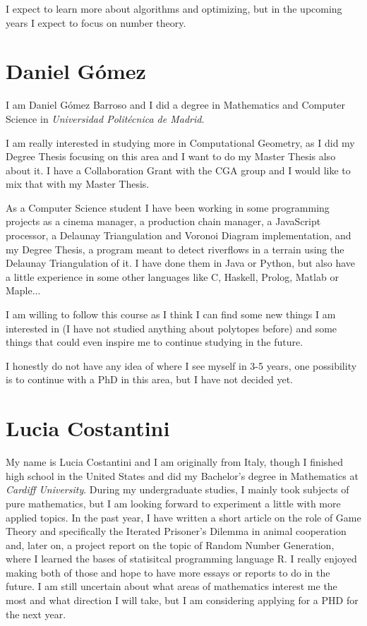 \documentclass[11pt]{amsart}
\begin{document}
I expect to learn more about algorithms and optimizing, but in the upcoming years I expect to focus on number theory.

\medskip

\section*{Daniel Gómez}

I am Daniel Gómez Barroso and I did a degree in Mathematics and Computer Science in \textit{Universidad Politécnica de Madrid}.

I am really interested in studying more in Computational Geometry, as I did my Degree Thesis focusing on this area and I want to do my Master Thesis also about it. I have a Collaboration Grant with the CGA group and I would like to mix that with my Master Thesis.

As a Computer Science student I have been working in some programming projects as a cinema manager, a production chain manager, a JavaScript processor, a Delaunay Triangulation and Voronoi Diagram implementation, and my Degree Thesis, a program meant to detect riverflows in a terrain using the Delaunay Triangulation of it. I have done them in Java or Python, but also have a little experience in some other languages like C, Haskell, Prolog, Matlab or Maple...

I am willing to follow this course as I think I can find some new things I am interested in (I have not studied anything about polytopes before) and some things that could even inspire me to continue studying in the future.

I honestly do not have any idea of where I see myself in 3-5 years, one possibility is to continue with a PhD in this area, but I have not decided yet.

\medskip

\section*{Lucia Costantini}

My name is Lucia Costantini and I am originally from Italy, though I finished high school in the United States and did my Bachelor's degree in Mathematics at \textit{Cardiff University}.
During my undergraduate studies, I mainly took subjects of pure mathematics, but I am looking forward to experiment a little with more applied topics. 
In the past year, I have written a short article on the role of Game Theory and specifically the Iterated Prisoner's Dilemma in animal cooperation and, later on, a project report on the topic of Random Number Generation, where I learned the bases of statisitcal programming language R. 
I really enjoyed making both of those and hope to have more essays or reports to do in the future.
I am still uncertain about what areas of mathematics interest me the most and what direction I will take, but I am considering applying for a PHD for the next year.
\end{document}
